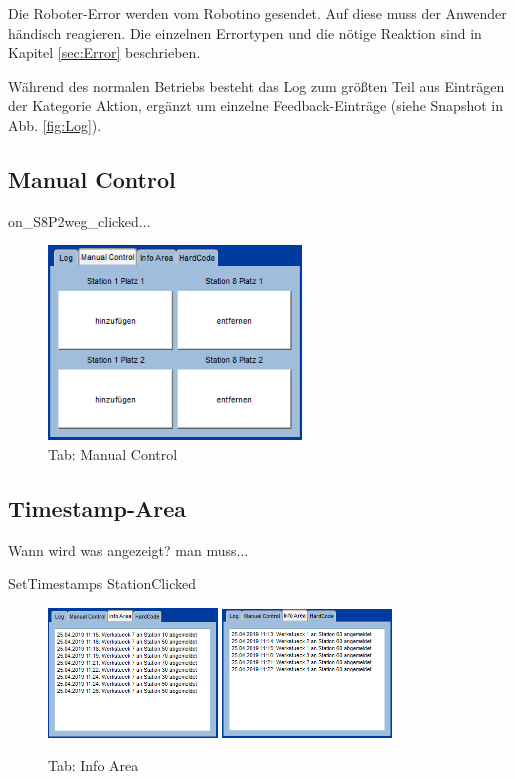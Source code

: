 Die Roboter-Error werden vom Robotino gesendet. Auf diese muss der Anwender händisch reagieren. Die einzelnen Errortypen und die nötige Reaktion sind in Kapitel \ref{sec:Error} beschrieben. 

Während des normalen Betriebs besteht das Log zum größten Teil aus Einträgen der Kategorie Aktion, ergänzt um einzelne Feedback-Einträge (siehe Snapshot in Abb. \ref{fig:Log}).  

\subsection{Manual Control}

on_S8P2weg_clicked...

\begin{figure}[htb]
    \centering
    \includegraphics[width=0.6\textwidth]{Abbildungen/ManualControl.png}
    \caption{Tab: Manual Control}		
    \label{fig:ManualControl}
\end{figure}

\subsection{Timestamp-Area}

Wann wird was angezeigt? man muss...

SetTimestamps
StationClicked
\begin{figure}[htb]
    \centering
    \includegraphics[width=0.4\textwidth]{Abbildungen/TimestampsWerkstueck.png}
    \includegraphics[width=0.4\textwidth]{Abbildungen/TimestampsStation.png}
    \caption{Tab: Info Area}		
    \label{fig:InfoArea}
\end{figure}

